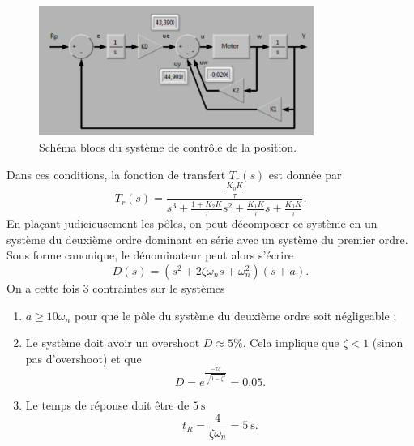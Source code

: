 \documentclass[frenchb, paper=a4, fontsize=11pt]{scrartcl}
\numberwithin{equation}{section}					%
\numberwithin{figure}{section}					%
\numberwithin{table}{section}						%
\begin{document}
\begin{figure}[ht]
	\centering
	\includegraphics[width=0.8\textwidth]{img/block_diagram_position_control.png}
	\caption{Schéma blocs du système de contrôle de la position.}
	\label{fig:block_diagram_position_control}
\end{figure}

Dans ces conditions, la fonction de transfert $T_r(s)$ est donnée par
\begin{equation}
	T_r(s) = \frac{\frac{K_0K}{\tau}}{s^3 + \frac{1+K_2K}{\tau}s^2 + \frac{K_1K}{\tau}s + \frac{K_0K}{\tau}}.
\end{equation}
En plaçant judicieusement les pôles, on peut décomposer ce système en un système
du deuxième ordre dominant en série avec un système du premier ordre. Sous forme
canonique, le dénominateur peut alors s'écrire
\begin{equation}
	D(s) = (s^2 + 2\zeta\omega_ns + \omega_n^2)(s+a).
\end{equation}
On a cette fois 3 contraintes sur le systèmes
\begin{enumerate}
	\item $a \geq 10\omega_n$ pour que le pôle du système du deuxième ordre soit
	négligeable ;
	\item Le système doit avoir un overshoot $D \approx 5\%$. Cela implique que
	$\zeta < 1$ (sinon pas d'overshoot) et que
	\begin{equation}
		D = e^{\frac{-\pi\zeta}{\sqrt{1-\zeta^2}}} = 0.05.
	\end{equation}
	\item Le temps de réponse doit être de $\SI{5}{\second}$
	\begin{equation}
		t_R = \frac{4}{\zeta\omega_n} = \SI{5}{\second}.
	\end{equation}
\end{enumerate}
\end{document}
